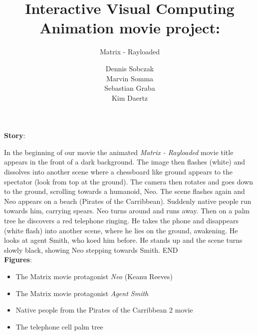 \documentclass{scrreprt}
\title{Interactive Visual Computing \\ Animation movie project:}
\subtitle{\huge{Matrix - Rayloaded}}
\author{Dennis Sobczak \\ Marvin Somma \\ Sebastian Graba \\ Kim Daertz}
\begin{document}
 
\maketitle
\textbf{Story}:

\noindent In the beginning of our movie the animated \emph{Matrix - Rayloaded} movie title appears in the front of a dark background. The image then flashes (white) and dissolves into another scene where a chessboard like ground appears to the spectator (look from top at the ground). The camera then rotates and goes down to the ground, scrolling towards a humanoid, Neo. The scene flashes again and Neo appears on a beach (Pirates of the Carribbean). Suddenly native people run towards him, carrying spears. Neo turns around and runs away. Then on a palm tree he discovers a red telephone ringing. He takes the phone and disappears (white flash) into another scene, where he lies on the ground, awakening. He looks at agent Smith, who koed him before. He stands up and the scene turns slowly black, showing Neo stepping towards Smith. END \\

\textbf{Figures}:
\begin{itemize}
\item{The Matrix movie protagonist \emph{Neo} (Keanu Reeves)}
\item{The Matrix movie protagonist \emph{Agent Smith}}
\item{Native people from the Pirates of the Carribbean 2 movie}
\item{The telephone cell palm tree}
\end{itemize}
\end{document}
